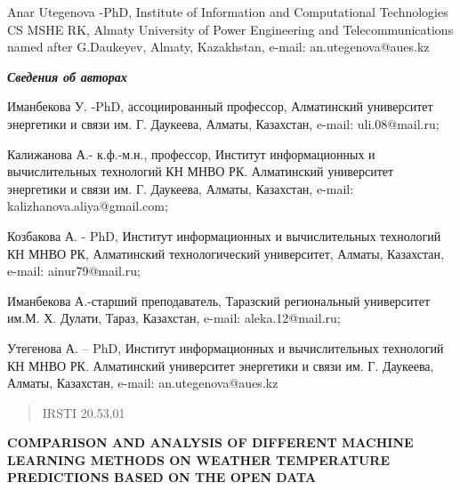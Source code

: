 Anar Utegenova -PhD, Institute of Information and Computational
Technologies CS MSHE RK, Almaty University of Power Engineering and
Telecommunications named after G.Daukeyev, Almaty, Kazakhstan, e-mail:
an.utegenova@aues.kz

\emph{\textbf{Сведения об авторах}}

Иманбекова У. -PhD, ассоциированный профессор, Алматинский университет
энергетики и связи им. Г. Даукеева, Алматы, Казахстан, e-mail:
uli.08@mail.ru;

Калижанова А.- к.ф.-м.н., профессор, Институт информационных и
вычислительных технологий КН МНВО РК. Алматинский университет энергетики
и связи им. Г. Даукеева, Алматы, Казахстан, e-mail:
kalizhanova.aliya@gmail.com;

Козбакова А. - PhD, Институт информационных и вычислительных технологий
КН МНВО РК, Алматинский технологический университет, Алматы, Казахстан,
e-mail: ainur79@mail.ru;

Иманбекова А.-старший преподаватель, Таразский региональный университет
им.М. Х. Дулати, Тараз, Казахстан, e-mail: aleka.12@mail.ru;

Утегенова А. -- PhD, Институт информационных и вычислительных технологий
КН МНВО РК. Алматинский университет энергетики и связи им. Г. Даукеева,
Алматы, Казахстан, e-mail: an.utegenova@aues.kz

\begin{quote}
IRSTI 20.53.01
\end{quote}

\textbf{COMPARISON AND ANALYSIS OF DIFFERENT MACHINE LEARNING METHODS ON
WEATHER TEMPERATURE PREDICTIONS BASED ON THE OPEN DATA}


